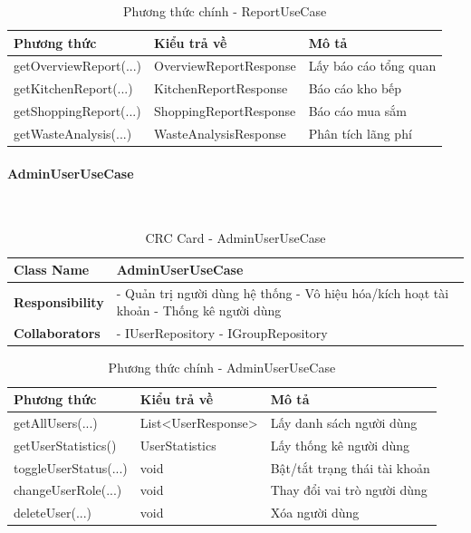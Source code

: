 \begin{table}[H]
\small
\renewcommand{\arraystretch}{1.3}
\begin{tabularx}{\textwidth}{|>{\raggedright\arraybackslash}p{5cm}|>{\raggedright\arraybackslash}p{3.5cm}|X|}
\hline
\rowcolor{gray!20}
\textbf{Phương thức} & \textbf{Kiểu trả về} & \textbf{Mô tả} \\
\hline
getOverviewReport(...) & OverviewReportResponse & Lấy báo cáo tổng quan \\
\hline
getKitchenReport(...) & KitchenReportResponse & Báo cáo kho bếp \\
\hline
getShoppingReport(...) & ShoppingReportResponse & Báo cáo mua sắm \\
\hline
getWasteAnalysis(...) & WasteAnalysisResponse & Phân tích lãng phí \\
\hline
\end{tabularx}
\caption{Phương thức chính - ReportUseCase}
\end{table}

\paragraph{AdminUserUseCase} ~\\

\begin{table}[H]
\small
\renewcommand{\arraystretch}{1.3}
\begin{tabularx}{\textwidth}{|>{\raggedright\arraybackslash}p{3.5cm}|X|}
\hline
\rowcolor{gray!20}
\textbf{Class Name} & AdminUserUseCase \\
\hline
\textbf{Responsibility} & - Quản trị người dùng hệ thống \newline - Vô hiệu hóa/kích hoạt tài khoản \newline - Thống kê người dùng \\
\hline
\textbf{Collaborators} & - IUserRepository \newline - IGroupRepository \\
\hline
\end{tabularx}
\caption{CRC Card - AdminUserUseCase}
\end{table}

\begin{table}[H]
\small
\renewcommand{\arraystretch}{1.3}
\begin{tabularx}{\textwidth}{|>{\raggedright\arraybackslash}p{5cm}|>{\raggedright\arraybackslash}p{3cm}|X|}
\hline
\rowcolor{gray!20}
\textbf{Phương thức} & \textbf{Kiểu trả về} & \textbf{Mô tả} \\
\hline
getAllUsers(...) & List<UserResponse> & Lấy danh sách người dùng \\
\hline
getUserStatistics() & UserStatistics & Lấy thống kê người dùng \\
\hline
toggleUserStatus(...) & void & Bật/tắt trạng thái tài khoản \\
\hline
changeUserRole(...) & void & Thay đổi vai trò người dùng \\
\hline
deleteUser(...) & void & Xóa người dùng \\
\hline
\end{tabularx}
\caption{Phương thức chính - AdminUserUseCase}
\end{table}

